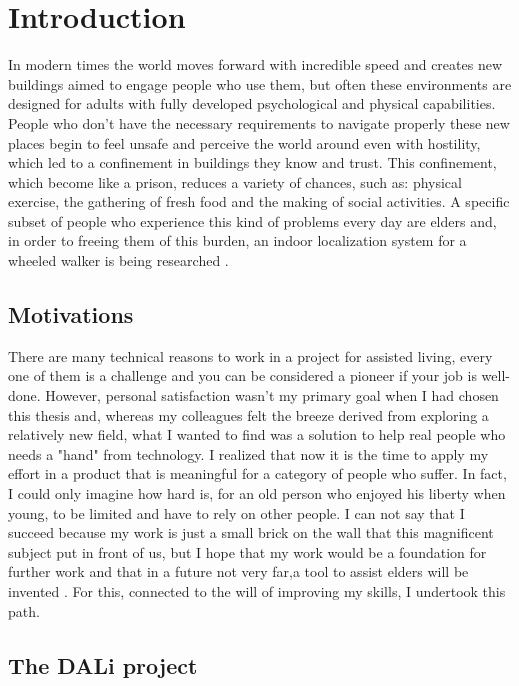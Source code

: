 \chapter{Introduction}
In modern times the world moves forward with incredible speed and creates new buildings aimed to engage people who use them, but often these environments are designed for adults with fully developed psychological and physical capabilities.
People who don't have the necessary requirements to navigate properly these new places begin to feel unsafe and perceive the world around even with hostility, which led to a confinement in buildings they know and trust.
This confinement, which become like a prison, reduces a variety of chances, such as: physical exercise, the gathering of fresh food and the making of social activities.
A specific subset of people who experience this kind of problems every day are elders and, in order to freeing them of this burden, an indoor localization system for a wheeled walker is being researched . 

\section{Motivations}

There are many technical reasons to work in a project for assisted living, every one of them is a challenge and you can be considered a pioneer if your job is well-done.
However, personal satisfaction wasn't my primary goal when I had chosen this thesis and, whereas my colleagues felt the breeze derived from exploring a relatively new field, what I wanted to find was a solution to help real people who needs a "hand" from technology.
I realized that now it is the time to apply my effort in a product that is meaningful for a category of people who suffer. 
In fact, I could only imagine how hard is, for an old person who enjoyed his liberty when young, to be limited and have to rely on other people.
I can not say that I succeed because my work is just a small brick on the wall that this magnificent subject put in front of us, but I hope that my work would be a foundation for further work and that in a future not very far,a tool to assist elders will be invented .
For this, connected to the will of improving my skills, I undertook this path.

\section{The DALi project}

